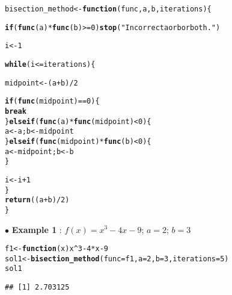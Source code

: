\documentclass[11pt, a4paper]{article}\usepackage[]{graphicx}\usepackage[]{xcolor}
\makeatletter
\newcommand{\hlnum}[1]{\textcolor[rgb]{0.686,0.059,0.569}{#1}}%
\newcommand{\hlsng}[1]{\textcolor[rgb]{0.192,0.494,0.8}{#1}}%
\newcommand{\hlopt}[1]{\textcolor[rgb]{0,0,0}{#1}}%
\newcommand{\hldef}[1]{\textcolor[rgb]{0.345,0.345,0.345}{#1}}%
\newcommand{\hlkwa}[1]{\textcolor[rgb]{0.161,0.373,0.58}{\textbf{#1}}}%
\newcommand{\hlkwb}[1]{\textcolor[rgb]{0.69,0.353,0.396}{#1}}%
\newcommand{\hlkwc}[1]{\textcolor[rgb]{0.333,0.667,0.333}{#1}}%
\newcommand{\hlkwd}[1]{\textcolor[rgb]{0.737,0.353,0.396}{\textbf{#1}}}%
\newenvironment{kframe}{%
 \def\at@end@of@kframe{}%
 \ifinner\ifhmode%
  \def\at@end@of@kframe{\end{minipage}}%
  \begin{minipage}{\columnwidth}%
 \fi\fi%
 \def\FrameCommand##1{\hskip\@totalleftmargin \hskip-\fboxsep
 \colorbox{shadecolor}{##1}\hskip-\fboxsep
     \hskip-\linewidth \hskip-\@totalleftmargin \hskip\columnwidth}%
 \MakeFramed {\advance\hsize-\width
   \@totalleftmargin\z@ \linewidth\hsize
   \@setminipage}}%
 {\par\unskip\endMakeFramed%
 \at@end@of@kframe}
\newenvironment{knitrout}{}{} %
\makeatother
\begin{document}
\begin{knitrout}\footnotesize
{}\color{fgcolor}\begin{kframe}
\begin{alltt}
\hldef{bisection_method} \hlkwb{<-} \hlkwa{function}\hldef{(}\hlkwc{func}\hldef{,} \hlkwc{a}\hldef{,} \hlkwc{b}\hldef{,} \hlkwc{iterations}\hldef{)\{}

  \hlkwa{if}\hldef{(}\hlkwd{func}\hldef{(a)} \hlopt{*} \hlkwd{func}\hldef{(b)} \hlopt{>=} \hlnum{0}\hldef{)} \hlkwd{stop}\hldef{(}\hlsng{"Incorrect a or b or both."}\hldef{)}

  \hldef{i} \hlkwb{<-} \hlnum{1}

  \hlkwa{while}\hldef{(i} \hlopt{<=} \hldef{iterations)\{}

    \hldef{midpoint} \hlkwb{<-} \hldef{(a} \hlopt{+} \hldef{b)} \hlopt{/} \hlnum{2}

    \hlkwa{if}\hldef{(}\hlkwd{func}\hldef{(midpoint)} \hlopt{==} \hlnum{0}\hldef{)\{}
      \hlkwa{break}
    \hldef{\}} \hlkwa{else if}\hldef{(}\hlkwd{func}\hldef{(a)} \hlopt{*} \hlkwd{func}\hldef{(midpoint)} \hlopt{<} \hlnum{0}\hldef{)\{}
      \hldef{a} \hlkwb{<-} \hldef{a; b} \hlkwb{<-} \hldef{midpoint}
    \hldef{\}} \hlkwa{else if}\hldef{(}\hlkwd{func}\hldef{(midpoint)} \hlopt{*} \hlkwd{func}\hldef{(b)} \hlopt{<} \hlnum{0}\hldef{)\{}
      \hldef{a} \hlkwb{<-} \hldef{midpoint; b} \hlkwb{<-} \hldef{b}
    \hldef{\}}

    \hldef{i} \hlkwb{<-} \hldef{i} \hlopt{+} \hlnum{1}
  \hldef{\}}
  \hlkwd{return}\hldef{((a} \hlopt{+} \hldef{b)} \hlopt{/} \hlnum{2}\hldef{)}
\hldef{\}}
\end{alltt}
\end{kframe}
\end{knitrout}

\newpage

$\bullet$ \textbf{Example 1} : $f(x) = x^3 - 4x - 9$; $a = 2$; $b = 3$

\begin{knitrout}\footnotesize
{}\color{fgcolor}\begin{kframe}
\begin{alltt}
\hldef{f1} \hlkwb{<-} \hlkwa{function}\hldef{(}\hlkwc{x}\hldef{) x}\hlopt{^}\hlnum{3} \hlopt{-} \hlnum{4}\hlopt{*}\hldef{x} \hlopt{-} \hlnum{9}
\hldef{sol1} \hlkwb{<-} \hlkwd{bisection_method}\hldef{(}\hlkwc{func} \hldef{= f1,} \hlkwc{a} \hldef{=} \hlnum{2}\hldef{,} \hlkwc{b} \hldef{=} \hlnum{3}\hldef{,} \hlkwc{iterations} \hldef{=} \hlnum{5}\hldef{)}
\hldef{sol1}
\end{alltt}
\begin{verbatim}
## [1] 2.703125
\end{verbatim}
\end{kframe}
\end{knitrout}
\end{document}
